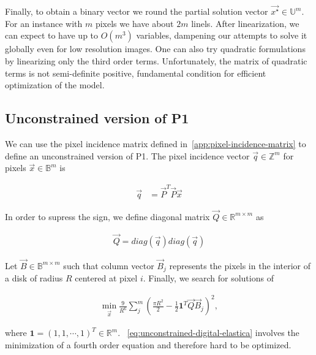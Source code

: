 	Finally, to obtain a binary vector we round the partial solution vector $\vec{x^{\star}} \in \mathbb{U}^m$. For an instance with $m$ pixels we have about $2m$ linels. After linearization, we can expect to have up to $O(m^3)$ variables, dampening our attempts to solve it globally even for low resolution images. One can also try quadratic formulations by linearizing only the third order terms. Unfortunately, the matrix of quadratic terms is not semi-definite positive, fundamental condition for efficient optimization of the model.
	


\subsection{Unconstrained version of P1}
\label{ch6:subsec:unconstrained-version}

We can use the pixel incidence matrix defined in~\cref{app:pixel-incidence-matrix} to define an unconstrained version of P1. The pixel incidence vector $\vec{q} \in \mathbb{Z}^m$ for pixels $\vec{x} \in \mathbb{B}^{m}$ is 
	
	\begin{align*}
		\vec{q} &= \vec{P}^T\vec{P} \vec{x}
	\end{align*}

In order to supress the sign, we define diagonal matrix $\vec{Q} \in \mathbb{R}^{m \times m }$ as

\begin{align*}
	\vec{Q} = diag(\vec{q})diag(\vec{q})
\end{align*}

Let $\vec{B} \in \mathbb{B}^{m\times m}$ such that column vector $\vec{B}_j$ represents the pixels in the interior of a disk of radius $R$ centered at pixel $i$. Finally, we search for solutions of

\begin{align}
	\min_{\vec{x}} \frac{9}{R^6}\sum_{j}^{m}{\left( \frac{\pi R^2}{2} - \frac{1}{2}\boldsymbol{\mathbf{1}}^T{\vec{Q}}\vec{B}_j \right)^2},
	\label{eq:unconstrained-digital-elastica}
\end{align}


where $\mathbf{1} = (1,1, \cdots , 1)^T \in \mathbb{R}^m$. ~\cref{eq:unconstrained-digital-elastica} involves the minimization of a fourth order equation and therefore hard to be optimized.

